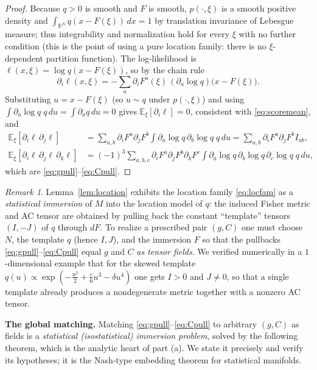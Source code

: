\documentclass{amsart}
\theoremstyle{definition}
\theoremstyle{remark}
\newtheorem{remark}{Remark}
\begin{document}
\begin{proof}
Because $q>0$ is smooth and $F$ is smooth, $p(\cdot,\xi)$ is a smooth positive
density and $\int_{\mathbb R^{N}}q(x-F(\xi))\,dx=1$ by translation invariance of
Lebesgue measure; thus integrability and normalization hold for every $\xi$ with
no further condition (this is the point of using a pure location family: there is
no $\xi$-dependent partition function). The log-likelihood is
$\ell(x,\xi)=\log q(x-F(\xi))$, so by the chain rule
\[
  \partial_{i}\ell(x,\xi)
    =-\sum_{a}\partial_{i}F^{a}(\xi)\,(\partial_{a}\log q)\bigl(x-F(\xi)\bigr).
\]
Substituting $u=x-F(\xi)$ (so $u\sim q$ under $p(\cdot,\xi)$) and using
$\int\partial_{a}\log q\;q\,du=\int\partial_{a}q\,du=0$ gives
$\mathbb E_{\xi}[\partial_{i}\ell]=0$, consistent with \eqref{eq:scoremean}, and
\begin{align*}
  \mathbb E_{\xi}[\partial_{i}\ell\,\partial_{j}\ell]
   &=\sum_{a,b}\partial_{i}F^{a}\partial_{j}F^{b}
     \int\partial_{a}\log q\,\partial_{b}\log q\;q\,du
   =\sum_{a,b}\partial_{i}F^{a}\partial_{j}F^{b}I_{ab},\\
  \mathbb E_{\xi}[\partial_{i}\ell\,\partial_{j}\ell\,\partial_{k}\ell]
   &=(-1)^{3}\sum_{a,b,c}\partial_{i}F^{a}\partial_{j}F^{b}\partial_{k}F^{c}
     \int\partial_{a}\log q\,\partial_{b}\log q\,\partial_{c}\log q\;q\,du,
\end{align*}
which are \eqref{eq:gpull}--\eqref{eq:Cpull}.
\end{proof}

\begin{remark}\label{rem:model}
Lemma~\ref{lem:location} exhibits the location family \eqref{eq:locfam} as a
\emph{statistical immersion} of $M$ into the location model of $q$: the induced
Fisher metric and AC tensor are obtained by pulling back the constant
``template'' tensors $(I,-J)$ of $q$ through $dF$. To realize a prescribed pair
$(g,C)$ one must choose $N$, the template $q$ (hence $I,J$), and the immersion
$F$ so that the pullbacks \eqref{eq:gpull}--\eqref{eq:Cpull} equal $g$ and $C$
\emph{as tensor fields}. We verified numerically in a $1$-dimensional example
that for the skewed template
$q(u)\propto\exp(-\tfrac{u^{2}}2+\tfrac{\varepsilon}6u^{3}-\delta u^{4})$ one
gets $I>0$ and $J\neq0$, so that a single template already produces a
nondegenerate metric together with a nonzero AC tensor.
\end{remark}

\medskip
\noindent\textbf{The global matching.}
Matching \eqref{eq:gpull}--\eqref{eq:Cpull} to arbitrary $(g,C)$ as fields is a
\emph{statistical (isostatistical) immersion problem}, solved by the following
theorem, which is the analytic heart of part (a). We state it precisely and
verify its hypotheses; it is the Nash-type embedding theorem for statistical
manifolds.
\end{document}
